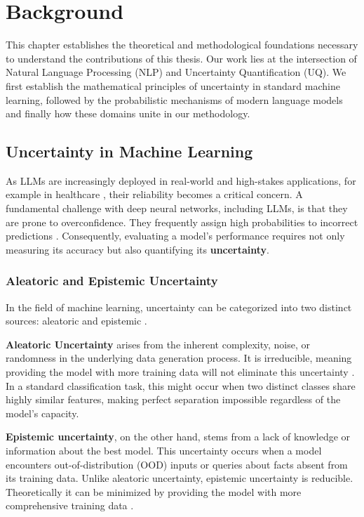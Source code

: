 %
\chapter{Background}
\label{sec:background}
This chapter establishes the theoretical and methodological 
foundations necessary to understand the contributions of this thesis. 
Our work lies at the intersection of Natural Language Processing (NLP)
and Uncertainty Quantification (UQ). 
We first establish the mathematical principles of uncertainty in
standard machine learning, followed by the probabilistic 
mechanisms of modern language models and finally how these 
domains unite in our methodology.


\section{Uncertainty in Machine Learning}
\label{sec:background:uncertainty}
As LLMs are increasingly deployed in real-world and high-stakes
applications, for example in healthcare
\parencite{10.1001/jama.2024.21700},
their reliability becomes a critical concern.
A fundamental challenge with deep neural networks, including LLMs,
is that they are prone to overconfidence. They frequently assign
high probabilities to incorrect predictions
\parencite{guo2017calibrationmodernneuralnetworks}.
Consequently, evaluating a model's performance requires not only
measuring its accuracy but also quantifying its \textbf{uncertainty}.


\subsection{Aleatoric and Epistemic Uncertainty}
\label{sec:background:uncertainty:aleatoric_epistemic}
In the field of machine learning, uncertainty can be 
categorized into two distinct sources: aleatoric and epistemic
\parencite{kendall2017uncertaintiesneedbayesiandeep, H_llermeier_2021}.

\textbf{Aleatoric Uncertainty} arises from the inherent complexity,
noise, or randomness in the underlying data generation process. It
is irreducible, meaning providing the model with more training data 
will not eliminate this uncertainty
\parencite{kendall2017uncertaintiesneedbayesiandeep, H_llermeier_2021}.
In a standard classification task, this might occur when two 
distinct classes share highly similar features, making perfect
separation impossible regardless of the model's capacity.


\textbf{Epistemic uncertainty}, on the other hand, stems from a lack
of knowledge or information about the best model.
This uncertainty occurs when a model encounters out-of-distribution
(OOD) inputs or queries about facts absent from its training data.
Unlike aleatoric uncertainty, epistemic uncertainty is reducible.
Theoretically it can be minimized by providing the model with more 
comprehensive training data
\parencite{kendall2017uncertaintiesneedbayesiandeep, H_llermeier_2021}.


